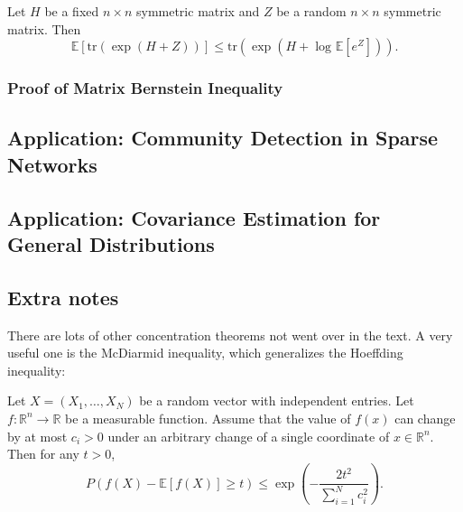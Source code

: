 \begin{lemma}
\label{em:5.4.9}
Let $H$ be a fixed $n \times n$ symmetric matrix and $Z$ be a random $n \times n$ symmetric matrix. Then 
\[ \mathbb{E}[\mathrm{tr}(\exp{(H + Z)})] \leq \mathrm{tr}(\exp{(H + \log_{}{\mathbb{E}[e^Z]})}). \]
\end{lemma}


\subsubsection{Proof of Matrix Bernstein Inequality}



\subsection{Application: Community Detection in Sparse Networks}



\subsection{Application: Covariance Estimation for General Distributions}



\subsection{Extra notes}
There are lots of other concentration theorems not went over in the text. A very useful one is the McDiarmid 
inequality, which generalizes the Hoeffding inequality:

\begin{theorem}
\label{thm:5.7.1}
Let $X = (X_1, \dots, X_N)$ be a random vector with independent entries. Let $f: \mathbb{R}^n \to \mathbb{R}$ 
be a measurable function. Assume that the value of $f(x)$ can change by at most $c_i > 0$ under an arbitrary 
change of a single coordinate of $x \in \mathbb{R}^n$. Then for any $t > 0$, 
\[ P(f(X) - \mathbb{E}[f(X)] \geq t) \leq \exp{\left( -\frac{2t^2}{\sum_{i = 1}^{N}c_i^2} \right)}. \]
\end{theorem}
